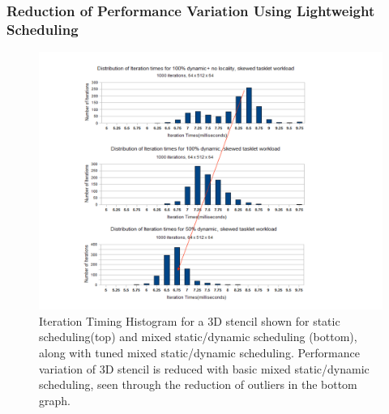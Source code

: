 \begin{frame}[label=hybstatdyndmf]
\begin{columns}
\begin{figure}
\end{figure}
\end{columns}
\end{frame}


\begin{frame}
\frametitle{Reduction of Performance Variation Using Lightweight Scheduling}  
\begin{figure}     
\includegraphics[scale=0.35]{./plots/IterTimesHisto-sdImprovement.pdf} 
\caption{\small Iteration Timing Histogram for a 3D stencil shown for static scheduling(top) and mixed static/dynamic scheduling (bottom), along with tuned mixed static/dynamic scheduling. Performance variation of 3D stencil is reduced with basic mixed static/dynamic scheduling, seen through the reduction of outliers in the bottom graph.}      
\end{figure}
\end{frame}


